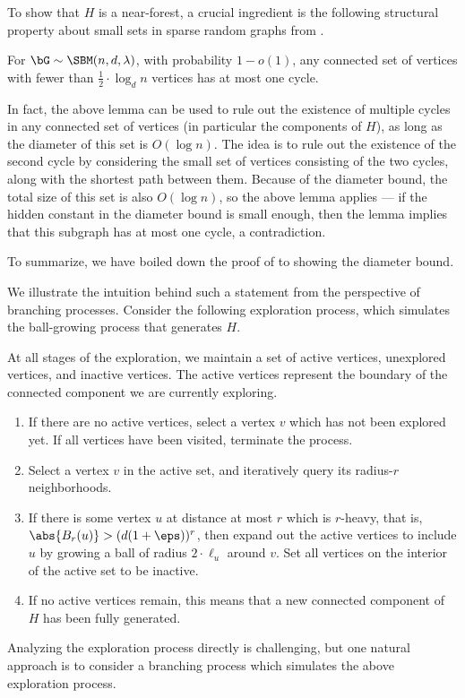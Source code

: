 \documentclass[11pt,letterpaper]{article}
\begin{document}
To show that $H$ is a near-forest, a crucial ingredient is the following  structural property about small sets in sparse random graphs from \cite[Lemma 30]{BLM15}.
\begin{displayquote}
    For $\bG \sim \SBM(n,d,\lambda)$, with probability $1-o(1)$, any connected set of vertices with fewer than $\frac{1}{2} \cdot \log_d n$ vertices has at most one cycle.
\end{displayquote}
In fact, the above lemma can be used to rule out the existence of multiple cycles in any connected set of vertices (in particular the components of $H$), as long as the diameter of this set is $O(\log n)$.
The idea is to rule out the existence of the second cycle by considering the small set of vertices consisting of the two cycles, along with the shortest path between them. 
Because of the diameter bound, the total size of this set is also $O(\log n)$, so the above lemma applies --- if the hidden constant in the diameter bound is small enough, then the lemma implies that this subgraph has at most one cycle, a contradiction.

To summarize, we have boiled down the proof of  to showing the diameter bound. 

We illustrate the intuition behind such a statement from the perspective of branching processes.
Consider the following exploration process, which simulates the ball-growing process that generates $H$.

At all stages of the exploration, we maintain a set of active vertices, unexplored vertices, and inactive vertices.
The active vertices represent the boundary of the connected component we are currently exploring.
\begin{enumerate}
    \item If there are no active vertices, select a vertex $v$ which has not been explored yet. If all vertices have been visited, terminate the process. 
    \item Select a vertex $v$ in the active set, and iteratively query its radius-$r$ neighborhoods. 
    \item If there is some vertex $u$ at distance at most $r$ which is $r$-heavy, that is, $\abs{B_{r}(u)} > (d(1+\eps))^r$, then expand out the active vertices to include $u$ by growing a ball of radius $2 \cdot \ell_u$ around $v$. Set all vertices on the interior of the active set to be inactive.
    \item If no active vertices remain, this means that a new connected component of $H$ has been fully generated. 
\end{enumerate}
Analyzing the exploration process directly is challenging, but one natural approach is to consider a branching process which simulates the above exploration process. 
\end{document}
